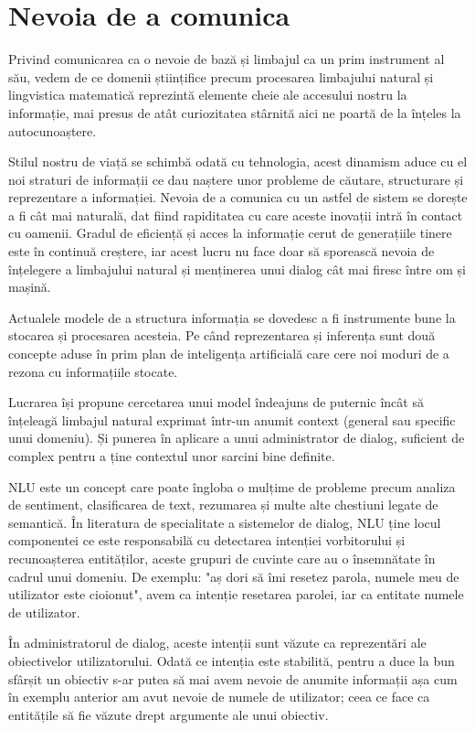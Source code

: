 \section{Nevoia de a comunica}

Privind comunicarea ca o nevoie de bază și limbajul ca un prim instrument al său, vedem de ce domenii științifice precum procesarea limbajului natural și lingvistica matematică reprezintă elemente cheie ale accesului nostru la informație, mai presus de atât curiozitatea stârnită aici ne poartă de la înțeles la autocunoaștere.

Stilul nostru de viață se schimbă odată cu tehnologia, acest dinamism aduce cu el noi straturi de informații ce dau naștere unor probleme de căutare, structurare și reprezentare a informației. Nevoia de a comunica cu un astfel de sistem se dorește a fi cât mai naturală, dat fiind rapiditatea cu care aceste inovații intră în contact cu oamenii. Gradul de eficiență și acces la informație cerut de generațiile tinere este în continuă creștere, iar acest lucru nu face doar să sporească nevoia de înțelegere a limbajului natural și menținerea unui dialog cât mai firesc între om și mașină.

Actualele modele de a structura informația se dovedesc a fi instrumente bune la stocarea și procesarea acesteia. Pe când reprezentarea și inferența sunt două concepte aduse în prim plan de inteligența artificială care cere noi moduri de a rezona cu informațiile stocate.

Lucrarea își propune cercetarea unui model îndeajuns de puternic încât să înțeleagă limbajul natural exprimat într-un anumit context (general sau specific unui domeniu). Și punerea în aplicare a unui administrator de dialog, suficient de complex pentru a ține contextul unor sarcini bine definite.

NLU este un concept care poate îngloba o mulțime de probleme precum analiza de sentiment, clasificarea de text, rezumarea și multe alte chestiuni legate de semantică. În literatura de specialitate a sistemelor de dialog, NLU ține locul componentei ce este responsabilă cu detectarea intenției vorbitorului și recunoașterea entităților, aceste grupuri de cuvinte care au o însemnătate în cadrul unui domeniu.
De exemplu: "aș dori să îmi resetez parola, numele meu de utilizator este cioionut", avem ca intenție resetarea parolei, iar ca entitate numele de utilizator.

În administratorul de dialog, aceste intenții sunt văzute ca reprezentări ale obiectivelor utilizatorului. Odată ce intenția este stabilită, pentru a duce la bun sfârșit un obiectiv s-ar putea să mai avem nevoie de anumite informații așa cum în exemplu anterior am avut nevoie de numele de utilizator; ceea ce face ca entitățile să fie văzute drept argumente ale unui obiectiv.

